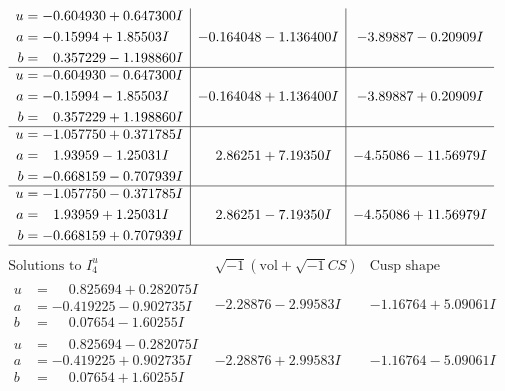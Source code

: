 \documentclass[1p]{elsarticle_modified}
\theoremstyle{definition}
\newcommand{\I}{\sqrt{-1}}
\begin{document}
$$\begin{array}{c|c|c}
\begin{aligned}
u &= -0.604930 + 0.647300 I \\
a &= -0.15994 + 1.85503 I \\
b &= \phantom{-}0.357229 - 1.198860 I\end{aligned}
 & -0.164048 - 1.136400 I & -3.89887 - 0.20909 I \\ \hline\begin{aligned}
u &= -0.604930 - 0.647300 I \\
a &= -0.15994 - 1.85503 I \\
b &= \phantom{-}0.357229 + 1.198860 I\end{aligned}
 & -0.164048 + 1.136400 I & -3.89887 + 0.20909 I \\ \hline\begin{aligned}
u &= -1.057750 + 0.371785 I \\
a &= \phantom{-}1.93959 - 1.25031 I \\
b &= -0.668159 - 0.707939 I\end{aligned}
 & \phantom{-}2.86251 + 7.19350 I & -4.55086 - 11.56979 I \\ \hline\begin{aligned}
u &= -1.057750 - 0.371785 I \\
a &= \phantom{-}1.93959 + 1.25031 I \\
b &= -0.668159 + 0.707939 I\end{aligned}
 & \phantom{-}2.86251 - 7.19350 I & -4.55086 + 11.56979 I\\
 \hline 
 \end{array}$$\newpage$$\begin{array}{c|c|c}  
\text{Solutions to }I^u_{4}& \I (\text{vol} + \sqrt{-1}CS) & \text{Cusp shape}\\
 \hline 
\begin{aligned}
u &= \phantom{-}0.825694 + 0.282075 I \\
a &= -0.419225 - 0.902735 I \\
b &= \phantom{-}0.07654 - 1.60255 I\end{aligned}
 & -2.28876 - 2.99583 I & -1.16764 + 5.09061 I \\ \hline\begin{aligned}
u &= \phantom{-}0.825694 - 0.282075 I \\
a &= -0.419225 + 0.902735 I \\
b &= \phantom{-}0.07654 + 1.60255 I\end{aligned}
 & -2.28876 + 2.99583 I & -1.16764 - 5.09061 I \\ \hline\begin{aligned}

\end{aligned}
\end{array}$$
\end{document}
